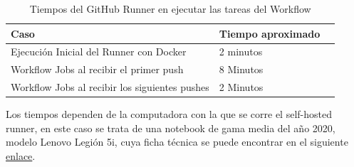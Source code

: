 \begin{table}[H]
\begin{center}
\begin{tabular}{lll}
\hline
\multicolumn{1}{|l|}{\textbf{Caso}} & \multicolumn{1}{l|}{\textbf{Tiempo aproximado}} \\ \hline
\multicolumn{1}{|l|}{Ejecución Inicial del Runner con Docker} & \multicolumn{1}{l|}{2 minutos} \\ \hline
\multicolumn{1}{|l|}{Workflow Jobs al recibir el primer push} & \multicolumn{1}{l|}{8 Minutos} \\ \hline
\multicolumn{1}{|l|}{Workflow Jobs al recibir los siguientes pushes} & \multicolumn{1}{l|}{2 Minutos} \\ \hline
\end{tabular}
\caption{Tiempos del GitHub Runner en ejecutar las tareas del Workflow}
\label{tab:multiplicadores-minutos}
\end{center}
\end{table}

Los tiempos dependen de la computadora con la que se corre el self-hosted runner, en este caso se trata de una notebook de gama media del año 2020, modelo Lenovo Legión 5i, cuya ficha técnica se puede encontrar en el siguiente \href{https://www.lenovo.com/ar/es/laptops/laptops-legion/legion-5-series/Legion-5i-15/p/88GMY501434}{enlace}.


